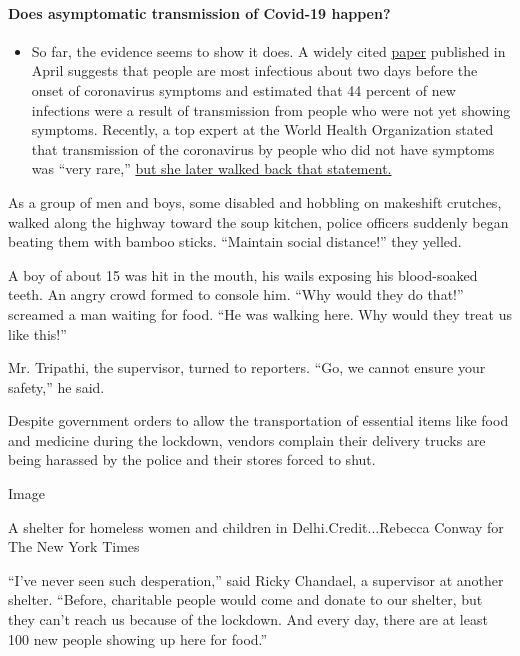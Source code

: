 \begin{itemize}
{  \paragraph{Does asymptomatic transmission of Covid-19
  happen?}\label{does-asymptomatic-transmission-of-covid-19-happen}}

  \begin{itemize}
  \tightlist
  \item
    So far, the evidence seems to show it does. A widely cited
    \href{https://www.nature.com/articles/s41591-020-0869-5}{paper}
    published in April suggests that people are most infectious about
    two days before the onset of coronavirus symptoms and estimated that
    44 percent of new infections were a result of transmission from
    people who were not yet showing symptoms. Recently, a top expert at
    the World Health Organization stated that transmission of the
    coronavirus by people who did not have symptoms was ``very rare,''
    \href{https://www.nytimes.com/2020/06/09/world/coronavirus-updates.html?action=click\&pgtype=Article\&state=default\&region=MAIN_CONTENT_3\&context=storylines_faq\#link-1f302e21}{but
    she later walked back that statement.}
  \end{itemize}
\end{itemize}

As a group of men and boys, some disabled and hobbling on makeshift
crutches, walked along the highway toward the soup kitchen, police
officers suddenly began beating them with bamboo sticks. ``Maintain
social distance!'' they yelled.

A boy of about 15 was hit in the mouth, his wails exposing his
blood-soaked teeth. An angry crowd formed to console him. ``Why would
they do that!'' screamed a man waiting for food. ``He was walking here.
Why would they treat us like this!''

Mr. Tripathi, the supervisor, turned to reporters. ``Go, we cannot
ensure your safety,'' he said.

Despite government orders to allow the transportation of essential items
like food and medicine during the lockdown, vendors complain their
delivery trucks are being harassed by the police and their stores forced
to shut.

Image

A shelter for homeless women and children in Delhi.Credit...Rebecca
Conway for The New York Times

``I've never seen such desperation,'' said Ricky Chandael, a supervisor
at another shelter. ``Before, charitable people would come and donate to
our shelter, but they can't reach us because of the lockdown. And every
day, there are at least 100 new people showing up here for food.''


